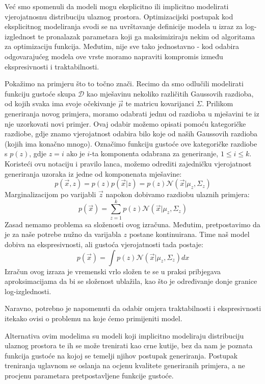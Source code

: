 Već smo spomenuli da modeli mogu eksplicitno ili implicitno modelirati vjerojatnosnu distribuciju ulaznog prostora. Optimizacijski postupak kod eksplicitnog modeliranja svodi se na uvrštavanje definicije modela u izraz za log-izglednost te pronalazak parametara koji ga maksimiziraju nekim od algoritama za optimizaciju funkcija. Međutim, nije sve tako jednostavno - kod odabira odgovarajućeg modela ove vrste moramo napraviti kompromis između ekspresivnosti i traktabilnosti. 

Pokažimo na primjeru što to točno znači. Recimo da smo odlučili modelirati funkciju gustoće skupa $\mathcal{D}$ kao mješavinu nekoliko različitih Gaussovih razdioba, od kojih svaka ima svoje očekivanje $\vec{\mu}$ te matricu kovarijanci $\Sigma$. Prilikom generiranja novog primjera, moramo odabrati jednu od razdioba u mješavini te iz nje uzorkovati novi primjer. Ovaj odabir možemo opisati pomoću kategoričke razdiobe, gdje znamo vjerojatnost odabira bilo koje od naših Gaussovih razdioba (kojih ima konačno mnogo). Označimo funkciju gustoće ove kategoričke razdiobe s $p(z)$, gdje $z = i$ ako je $i$-ta komponenta odabrana za generiranje, $1 \leq i \leq k$. Koristeći ovu notaciju i pravilo lanca, možemo odrediti zajedničku vjerojatnost generiranja uzoraka iz jedne od komponenata mješavine:
\begin{equation*}
	p(\vec{x}, z) = p(z)p(\vec{x}|z) = p(z) \mathcal{N}(\vec{x}|\mu_z, \Sigma_z)
\end{equation*}
Marginalizacijom po varijabli $\vec{z}$ napokon dobivamo razdiobu ulaznih primjera:
\begin{equation*}
	p(\vec{x}) = \sum_{z=1}^k p(z)\mathcal{N}(\vec{x}|\mu_z, \Sigma_z)
\end{equation*}
Zasad nemamo problema sa složenosti ovog izračuna. Međutim, pretpostavimo da je za naše potrebe nužno da varijabla $z$ postane kontinuirana. Time naš model dobiva na ekspresivnosti, ali gustoća vjerojatnosti tada postaje:
\begin{equation*}
	p(\vec{x}) = \int p(z)\mathcal{N}(\vec{x}|\mu_z, \Sigma_z)dx
\end{equation*}
Izračun ovog izraza je vremenski vrlo složen te se u praksi pribjegava aproksimacijama da bi se složenost ublažila, kao što je određivanje donje granice log-izglednosti. \citep{kingma2013autoencoding}

Naravno, potrebno je napomenuti da odabir omjera traktabilnosti i ekspresivnosti itekako ovisi o problemu na koje ćemo primijeniti model.

Alternativa ovim modelima su modeli koji implicitno modeliraju distribuciju ulaznog prostora te ih se može trenirati kao crne kutije, bez da nam je poznata funkcija gustoće na kojoj se temelji njihov postupak generiranja. Postupak treniranja uglavnom se oslanja na ocjenu kvalitete generiranih primjera, a ne procjenu parametara pretpostavljene funkcije gustoće.



